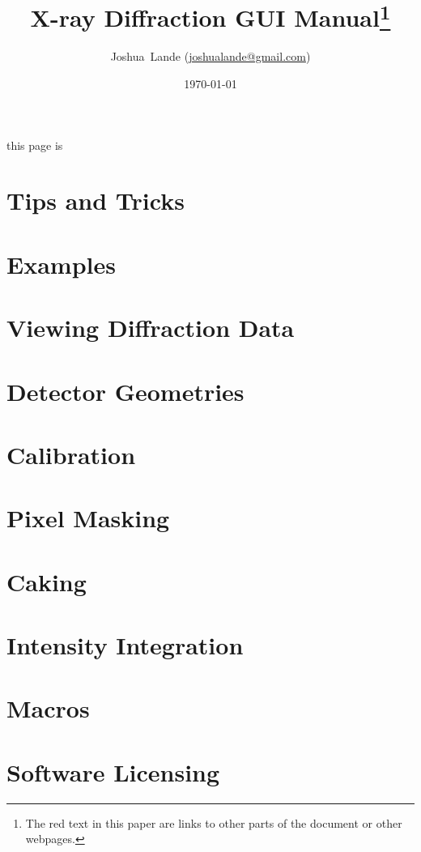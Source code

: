 \documentclass[12pt]{book}
\begin{document}
\title{X-ray Diffraction GUI Manual\footnote{The red text in this paper are links to other parts of the document or other webpages.}}
\date{\today}
\author{Joshua~Lande (\href{mailto:joshualande@gmail.com}{joshualande@gmail.com})}

\setcounter{page}{1}

\maketitle

\label{this}
this page is \pageref{this}

\tableofcontents

\chapter{Tips and Tricks}


\chapter{Examples}


\chapter{Viewing Diffraction Data}\label{viewing_data}


\chapter{Detector Geometries}


\chapter{Calibration}\label{calibration}



\chapter{Pixel Masking}



\chapter{Caking}\label{Caking}


\chapter{Intensity Integration}


\chapter{Macros}


\chapter{Software Licensing}



 

\printindex
\end{document}
